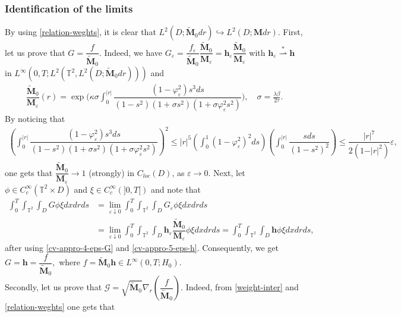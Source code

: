 \documentclass[a4paper,12pt, reqno]{amsart}
\begin{document}
    \subsubsection*{Identification of the limits}
 By using \eqref{relation-weghts},  it is clear  that $ L^2(D;\widetilde{\mathbf{M}}_0dr) \hookrightarrow L^2(D;\mathbf{M}dr).$ First, let us prove  that $G=\dfrac{f}{\widetilde{\mathbf{M}}_0}$. Indeed, we have
 $G_\varepsilon=\dfrac{f_\varepsilon}{ \widetilde{\mathbf{M}}_0}\dfrac{\widetilde{\mathbf{M}}_0}{\mathbf{M}_\varepsilon}=\mathbf{h}_\varepsilon\dfrac{\widetilde{\mathbf{M}}_0}{\mathbf{M}_\varepsilon}$ with  $\mathbf{h}_\varepsilon \overset{*}{\rightharpoonup} \mathbf{h}$		in	 $ L^\infty(0, T;L^2(\mathbb{T}^2,L^2(D;\widetilde{\mathbf{M}}_0dr)))$ and 
 \begin{align*}    
 \dfrac{\widetilde{\mathbf{M}}_0}{\mathbf{M}_\varepsilon}(r)=\exp{\big(\kappa\sigma\int_0^{\vert r\vert} \dfrac{(1-\varphi_\varepsilon^2)s^3 ds}{(1-s^2)(1+\sigma s^2)(1+\sigma\varphi_\varepsilon^2 s^2)}  \big)}, \quad \sigma=\frac{\lambda\beta}{2 \tau}.
 \end{align*}
 By noticing that 
 \begin{align*}
 (\int_0^{\vert r\vert} \dfrac{(1-\varphi_\varepsilon^2)s^3 ds}{(1-s^2)(1+\sigma s^2)(1+\sigma\varphi_\varepsilon^2 s^2)})^2 \leq \vert r\vert^5(\int_0^1 (1-\varphi_\varepsilon^2)^2 ds) (\int_0^{\vert r\vert} \dfrac{sds}{(1-s^2)^2}) \leq \dfrac{\vert r\vert^7}{2(1-\vert r\vert^2)}\varepsilon,     
 \end{align*}
 one gets that $\dfrac{\widetilde{\mathbf{M}}_0}{\mathbf{M}_\varepsilon} \to 1$ (strongly)  in $C_{loc}(D)$, as $\varepsilon\to0.$ Next, let $\phi\in C^\infty_c(\mathbb{T}^2\times D)$ and $\xi\in C^\infty_c(]0,T[)$ and note that 
 \begin{align*}
 \int_0^T \int_{\mathbb{T}^2}\int_D G\phi\xi dxdrds &=\lim_{\varepsilon\downarrow 0}   \int_0^T \int_{\mathbb{T}^2}\int_D G_\varepsilon\phi\xi dxdrds\\&=\lim_{\varepsilon\downarrow 0} \int_0^T \int_{\mathbb{T}^2}\int_D\mathbf{h}_\varepsilon\dfrac{\widetilde{\mathbf{M}}_0}{\mathbf{M}_\varepsilon}\phi\xi dxdrds=\int_0^T \int_{\mathbb{T}^2}\int_D\mathbf{h}\phi\xi dxdrds,
 \end{align*}
after using \eqref{cv-appro-4-eps-G}  and \eqref{cv-appro-5-eps-h}.
Consequently, we get $G=\mathbf{h}=\dfrac{f}{\widetilde{\mathbf{M}}_0},$ where 
   $f=\widetilde{\mathbf{M}}_0\mathbf{h}\in L^\infty(0, T;H_0).$\\
   Secondly, let us prove that $ \mathcal{G}=\sqrt{\widetilde{\mathbf{M}}_0}\nabla_r(\dfrac{f}{\widetilde{\mathbf{M}}_0})$. Indeed, from \eqref{weight-inter} and \eqref{relation-weghts} one gets that 
\end{document}
